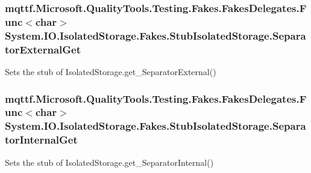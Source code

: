 \hypertarget{class_system_1_1_i_o_1_1_isolated_storage_1_1_fakes_1_1_stub_isolated_storage_a8aedc87a6e7421cfc38dd89e40eaf01d}{
\subsubsection[{Separator\-External\-Get}]{\setlength{\rightskip}{0pt plus 5cm}mqttf.\-Microsoft.\-Quality\-Tools.\-Testing.\-Fakes.\-Fakes\-Delegates.\-Func$<$char$>$ System.\-I\-O.\-Isolated\-Storage.\-Fakes.\-Stub\-Isolated\-Storage.\-Separator\-External\-Get}}\label{class_system_1_1_i_o_1_1_isolated_storage_1_1_fakes_1_1_stub_isolated_storage_a8aedc87a6e7421cfc38dd89e40eaf01d}


Sets the stub of Isolated\-Storage.\-get\-\_\-\-Separator\-External()

\hypertarget{class_system_1_1_i_o_1_1_isolated_storage_1_1_fakes_1_1_stub_isolated_storage_a87cbb540877f8ef44e7dc73eea09c259}{
\subsubsection[{Separator\-Internal\-Get}]{\setlength{\rightskip}{0pt plus 5cm}mqttf.\-Microsoft.\-Quality\-Tools.\-Testing.\-Fakes.\-Fakes\-Delegates.\-Func$<$char$>$ System.\-I\-O.\-Isolated\-Storage.\-Fakes.\-Stub\-Isolated\-Storage.\-Separator\-Internal\-Get}}\label{class_system_1_1_i_o_1_1_isolated_storage_1_1_fakes_1_1_stub_isolated_storage_a87cbb540877f8ef44e7dc73eea09c259}


Sets the stub of Isolated\-Storage.\-get\-\_\-\-Separator\-Internal()

